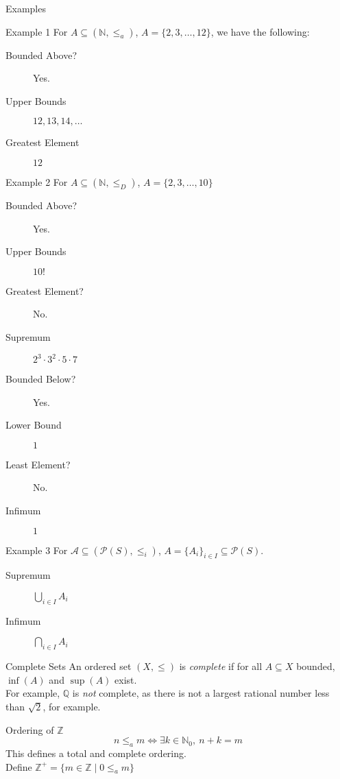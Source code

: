 \documentclass[10pt]{extarticle}
\newcommand{\N}{\mathbb{N}}
\newcommand{\Q}{\mathbb{Q}}
\newcommand{\Z}{\mathbb{Z}}
\begin{document}
  \begin{problem}{Examples}
    \begin{problem}{Example 1}
      For $A\subseteq (\N,\leq_a)$, $A = \{2,3,\dots,12\}$, we have the following:
      \begin{description}
        \item[Bounded Above?] Yes.
        \item[Upper Bounds] $12,13,14,\dots$
        \item[Greatest Element] $12$
      \end{description}
    \end{problem}
    \begin{problem}{Example 2}
    For $A\subseteq (\N,\leq_D)$, $A = \{2,3,\dots,10\}$
    \begin{description}
      \item[Bounded Above?] Yes.
      \item[Upper Bounds] $10!$
      \item[Greatest Element?] No.
      \item[Supremum] $2^3\cdot3^2\cdot5\cdot7$
      \item[Bounded Below?] Yes.
      \item[Lower Bound] $1$
      \item[Least Element?] No.
      \item[Infimum] $1$
    \end{description}
    \end{problem}
    \begin{problem}{Example 3}
      For $\mathcal{A}\subseteq (\mathcal{P}(S),\leq_i)$, $A = \{A_i\}_{i\in I} \subseteq \mathcal{P}(S)$.
      \begin{description}
        \item[Supremum] $\bigcup_{i\in I}A_i$
        \item[Infimum] $\bigcap_{i\in I}A_i$
      \end{description}
    \end{problem}
  \end{problem}
  \begin{problem}{Complete Sets}
    An ordered set $(X,\leq)$ is \textit{complete} if for all $A\subseteq X$ bounded, $\inf(A)$ and $\sup(A)$ exist.\\

    For example, $\Q$ is \textit{not} complete, as there is not a largest rational number less than $\sqrt{2}$, for example.
  \end{problem}
  \begin{problem}{Ordering of $\Z$}
    \[
      n\leq_a m \Leftrightarrow \exists k\in \N_0,~n+k=m
    \] 
    This defines a total and complete ordering.\\

    Define $\Z^+ = \{m\in \Z\mid 0\leq_a m\}$
  \end{problem}
\end{document}
